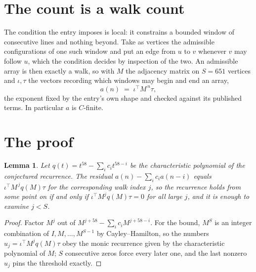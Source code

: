 \documentclass[11pt,a4paper]{article}
\theoremstyle{plain}
\newtheorem{lemma}[theorem]{Lemma}
\theoremstyle{definition}
\begin{document}
\section{The count is a walk count}

The condition the entry imposes is local: it constrains a bounded window of consecutive lines and nothing beyond. Take as
vertices the admissible configurations of one such window and put an edge from $u$ to $v$
whenever $v$ may follow $u$, which the condition decides by inspection of the two. An
admissible array is then exactly a walk, so with $M$ the adjacency matrix on $S=651$ vertices
and $\iota,\tau$ the vectors recording which windows may begin and end an array,
\[
a(n)\;=\;\iota^{\!\top}M^{\,n}\tau ,
\]
the exponent fixed by the entry's own shape and checked against its published terms. In
particular $a$ is $C$-finite.

\section{The proof}

\begin{lemma}\label{lem:crit}
Let $q(t)=t^{58}-\sum_i c_it^{58-i}$ be the characteristic polynomial of the
conjectured recurrence. The residual $a(n)-\sum_ic_ia(n-i)$ equals
$\iota^{\!\top}M^{\,j}q(M)\tau$ for the corresponding walk index $j$, so the recurrence
holds from some point on if and only if $\iota^{\!\top}M^{j}q(M)\tau=0$ for all large $j$,
and it is enough to examine $j<S$.
\end{lemma}

\begin{proof}
Factor $M^{j}$ out of $M^{j+58}-\sum_ic_iM^{j+58-i}$. For the bound, $M^{S}$
is an integer combination of $I,M,\dots,M^{S-1}$ by Cayley--Hamilton, so the numbers
$u_j=\iota^{\!\top}M^{j}q(M)\tau$ obey the monic recurrence given by the characteristic
polynomial of $M$; $S$ consecutive zeros force every later one, and the last nonzero $u_j$
pins the threshold exactly.
\end{proof}
\end{document}
